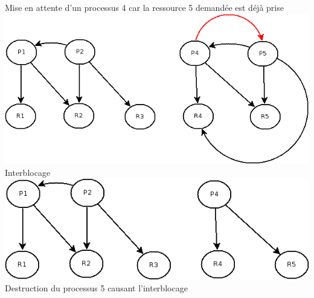 \documentclass{article}
\begin{document}
Mise en attente d'un processus 4 car la ressource 5 demandée est déjà prise\\
\includegraphics[scale=0.5]{images/test10}\\
Interblocage\\
\includegraphics[scale=0.5]{images/test11}\\
Destruction du processus 5 causant l'interblocage
\end{document}
